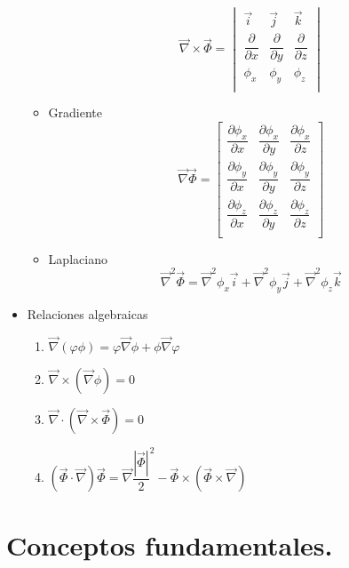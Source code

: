 \begin{itemize}
\begin{itemize}
		\[
		\vec\nabla \times \vec\Phi = \begin{vmatrix}
			\vec i & \vec j & \vec k \\
			\dfrac{\partial}{\partial x} & \dfrac{\partial}{\partial y} & \dfrac{\partial}{\partial z} \\
			\phi_x & \phi_y & \phi_z \\
		\end{vmatrix}
		\]
		\item Gradiente 
		\setlength{\arraycolsep}{1.5pt}
		\renewcommand{\arraystretch}{2}
		\[\vec\nabla  \vec\Phi = \begin{bmatrix}
			\dfrac{\partial \phi_x}{\partial x} & \dfrac{\partial \phi_x}{\partial y} & \dfrac{\partial \phi_x}{\partial z} \\
			\dfrac{\partial \phi_y}{\partial x} & \dfrac{\partial \phi_y}{\partial y} & \dfrac{\partial \phi_y}{\partial z} \\
			\dfrac{\partial \phi_z}{\partial x} & \dfrac{\partial \phi_z}{\partial y} & \dfrac{\partial \phi_z}{\partial z} \\
		\end{bmatrix}\]
		\item Laplaciano
		\[\vec{\nabla}^2\vec{\Phi}=\vec{\nabla}^2\phi_x\vec{i}+\vec{\nabla}^2\phi_y\vec{j}+\vec{\nabla}^2\phi_z\vec{k}\]
	\end{itemize}
	\item Relaciones algebraicas
	\begin{enumerate}
		\item $\vec{\nabla}(\varphi \phi) =\varphi\vec{\nabla}\phi+\phi\vec{\nabla}\varphi$
		\item $\vec{\nabla} \times \left(\vec{\nabla} \phi\right)=0$
		\item $\vec{\nabla} \cdot \left(\vec{\nabla} \times \vec{\Phi}\right) =0$
		\item $\left(\vec{\Phi}  \cdot \vec{\nabla}\right)\vec{\Phi}=\vec{\nabla} \dfrac{|\vec\Phi|}{2}^2-\vec\Phi \times \left(\vec{\Phi}  \times \vec{\nabla}\right) $ 
	\end{enumerate}
\end{itemize}

\section{Conceptos fundamentales.}

